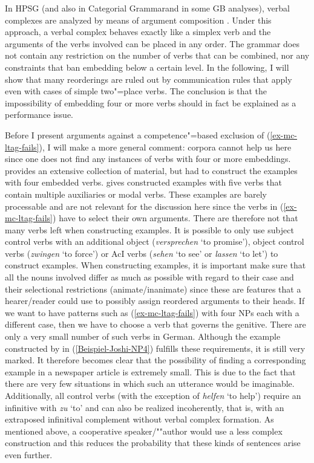 In HPSG (and also in Categorial Grammar\indexcg and in some GB analyses\indexgb), verbal complexes are analyzed by means of argument composition
\citep{HN89b,HN94a}. Under this approach, a verbal complex behaves exactly like a simplex verb and the arguments of the verbs involved can be placed
in any order. The grammar does not contain any restriction on the number of verbs that can be combined, nor any constraints that ban embedding below a certain
level. In the following, I will show that many reorderings are ruled out by communication rules that
apply even with cases of simple two"=place verbs. The conclusion is that the impossibility of embedding four or more verbs should in fact be explained as a performance issue.

Before I present arguments against a competence"=based exclusion of (\ref{ex-mc-ltag-fails}), I will make a more general comment:
corpora cannot help us here since one does not find any instances of verbs with four or more embeddings. \citet{Bech55a} provides
an extensive collection of material, but had to construct the examples with four embedded verbs.
\citet[--95]{Meurers99c} gives constructed examples with five verbs that contain multiple auxiliaries or modal verbs.
These examples are barely processable and are not relevant for the discussion here since the verbs in (\ref{ex-mc-ltag-fails})
have to select their own arguments. There are therefore not that many verbs left when constructing examples. It is possible to only use subject
control verbs with an additional object (\eg \emph{versprechen} `to promise'), object control verbs (\eg \emph{zwingen} `to force')
or AcI verbs (\eg \emph{sehen} `to see' or \emph{lassen} `to let') to construct examples.
When constructing examples, it is important make sure that all the nouns involved differ as much as possible with regard to their
case and their selectional restrictions (\eg animate/inanimate) since these are features that a hearer/reader could
use to possibly assign reordered arguments to their heads. If we want to have patterns such as (\ref{ex-mc-ltag-fails}) with four NPs each with a different
case, then we have to choose a verb that governs the genitive.
There are only a very small number of such verbs in German. Although the example constructed by \citet{JBR2000a} in (\ref{Beispiel-Joshi-NP4}) fulfills
these requirements, it is still very marked. It therefore becomes clear that the possibility of finding a corresponding example in a newspaper article
is extremely small. This is due to the fact that there are very few situations in which such an utterance would be imaginable. Additionally,
all control verbs (with the exception of \emph{helfen} `to help') require an infinitive with \emph{zu} `to' and can also be realized incoherently, that is,
with an extraposed infinitival complement without verbal complex formation. As mentioned above, a
cooperative speaker/""author would use a less complex construction and this reduces the probability
that these kinds of sentences arise even further.

